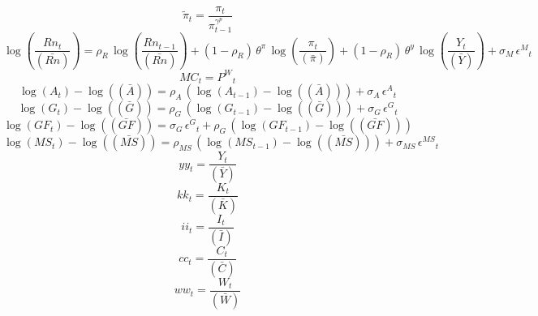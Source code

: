 \begin{dmath}
{\tilde{\pi}}_{t}=\frac{{\pi}_{t}}{{\pi}_{t-1}^{{{\gamma^{p}}}}}
\end{dmath}
\begin{dmath}
\log\left(\frac{{Rn}_{t}}{(\bar{Rn})}\right)={{\rho_{R}}}\, \log\left(\frac{{Rn}_{t-1}}{(\bar{Rn})}\right)+\left(1-{{\rho_{R}}}\right)\, {\theta^{\pi}}\, \log\left(\frac{{\pi}_{t}}{(\bar{\pi})}\right)+\left(1-{{\rho_{R}}}\right)\, {\theta^{y}}\, \log\left(\frac{{Y}_{t}}{(\bar{Y})}\right)+{{\sigma_{M}}}\, {{\epsilon^{M}}}_{t}
\end{dmath}
\begin{dmath}
{MC}_{t}={P^{W}}_{t}
\end{dmath}
\begin{dmath}
\log\left({A}_{t}\right)-\log\left((\bar{A})\right)={{\rho_{A}}}\, \left(\log\left({A}_{t-1}\right)-\log\left((\bar{A})\right)\right)+{{\sigma_{A}}}\, {{\epsilon^{A}}}_{t}
\end{dmath}
\begin{dmath}
\log\left({G}_{t}\right)-\log\left((\bar{G})\right)={{\rho_{G}}}\, \left(\log\left({G}_{t-1}\right)-\log\left((\bar{G})\right)\right)+{{\sigma_{G}}}\, {{\epsilon^{G}}}_{t}
\end{dmath}
\begin{dmath}
\log\left({GF}_{t}\right)-\log\left((\bar{GF})\right)={{\sigma_{G}}}\, {{\epsilon^{G}}}_{t}+{{\rho_{G}}}\, \left(\log\left({GF}_{t-1}\right)-\log\left((\bar{GF})\right)\right)
\end{dmath}
\begin{dmath}
\log\left({MS}_{t}\right)-\log\left((\bar{MS})\right)={{\rho_{MS}}}\, \left(\log\left({MS}_{t-1}\right)-\log\left((\bar{MS})\right)\right)+{{\sigma_{MS}}}\, {{\epsilon^{MS}}}_{t}
\end{dmath}
\begin{dmath}
{yy}_{t}=\frac{{Y}_{t}}{(\bar{Y})}
\end{dmath}
\begin{dmath}
{kk}_{t}=\frac{{K}_{t}}{(\bar{K})}
\end{dmath}
\begin{dmath}
{ii}_{t}=\frac{{I}_{t}}{(\bar{I})}
\end{dmath}
\begin{dmath}
{cc}_{t}=\frac{{C}_{t}}{(\bar{C})}
\end{dmath}
\begin{dmath}
{ww}_{t}=\frac{{W}_{t}}{(\bar{W})}
\end{dmath}
